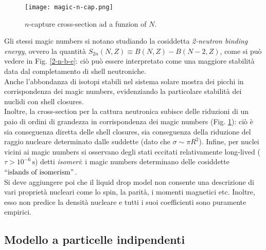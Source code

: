 \begin{figure}[!t]
	\centering
	\texttt{[image: magic-n-cap.png]}
	\caption{$ n $-capture cross-section ad a funzion of $ N $.}
	\label{n-cap-cr}
\end{figure}

Gli stessi magic numbers si notano studiando la cosiddetta \textit{2-neutron binding energy}, ovvero la quantità $ S_{2n}(N,Z) \equiv B(N,Z) - B(N-2,Z) $, come si può vedere in Fig. \ref{2-n-b-e}: ciò può essere interpretato come una maggiore stabilità data dal completamento di shell neutroniche.\\
Anche l'abbondanza di isotopi stabili nel sistema solare mostra dei picchi in corrispondenza dei magic numbers, evidenziando la particolare stabilità dei nuclidi con shell closures.\\
Inoltre, la cross-section per la cattura neutronica subisce delle riduzioni di un paio di ordini di grandezza in corrispondenza dei magic numbers (Fig. \ref{n-cap-cr}): ciò è sia conseguenza diretta delle shell closures, sia conseguenza della riduzione del raggio nucleare determinato dalle suddette (dato che $ \sigma \sim \pi R^2 $).
Infine, per nuclei vicini ai magic numbers si osservano degli stati eccitati relativamente long-lived ($ \tau > 10^{-6}\,\text{s} $) detti \textit{isomeri}: i magic numbers determinano delle cosiddette $ ``\text{islands of isomerism}" $.\\
Si deve aggiungere poi che il liquid drop model non consente una descrizione di vari proprietà nucleari come lo spin, la parità, i momenti magnetici etc. Inoltre, esso non predice la densità nucleare e tutti i suoi coefficienti sono puramente empirici.

\subsection{Modello a particelle indipendenti}

